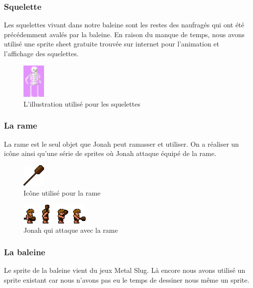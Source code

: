 \documentclass{prologArticle}
\begin{document}
\subsubsection{Squelette}
Les squelettes vivant dans notre baleine sont les restes des naufragés qui ont été précédemment avalés par la baleine. En raison du manque de temps, nous avons utilisé une sprite sheet gratuite trouvée sur internet pour l'animation et l'affichage des squelettes.

\begin{figure}[H]
    \centering
    \includegraphics[width=0.1\textwidth]{res/Skeleton.png}
    \caption{L'illustration utilisé pour les squelettes}
\end{figure}

\subsubsection{La rame}

La rame est le seul objet que Jonah peut ramasser et utiliser. On a réaliser un icône ainsi qu'une série de sprites où Jonah attaque équipé de la rame.

\begin{figure}[H]
    \centering
    \includegraphics[width=0.1\textwidth]{res/rame.png}
    \caption{Icône utilisé pour la rame}
\end{figure}

\begin{figure}[H]
    \centering
    \includegraphics[width=0.3\textwidth]{res/jonaharmed.png}
    \caption{Jonah qui attaque avec la rame}
\end{figure}

\subsubsection{La baleine}

Le sprite de la baleine vient du jeux Metal Slug. Là encore nous avons utilisé un sprite existant car nous n'avons pas eu le temps de dessiner nous même un sprite.
\end{document}
